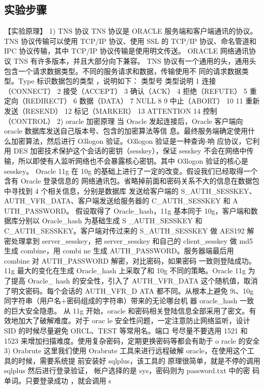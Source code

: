 \subsection{实验步骤}
【实验原理】
1) TNS 协议
TNS 协议是 ORACLE 服务端和客户端通讯的协议。TNS 协议传输可以使用 TCP/IP 协议、使用 SSL
的 TCP/IP 协议、命名管道和 IPC 协议传输，其中 TCP/IP 协议传输是使用明文传送。 ORACLE
网络通讯协议 TNS 有许多版本，并且大部分向下兼容。
TNS 协议有一个通用的头，通用头包含一个请求数据类型。不同的服务请求和数据，传输使用不
同的请求数据类型。Type 标识数据包的类型 ，说明如下：
类型号 类型说明
1 连接（CONNECT）
2 接受（ACCEPT）
3 确认（ACK）
4 拒绝（REFUTE）
5 重定向（REDIRECT）
6 数据（DATA）
7 NULL
8
9 中止（ABORT）
10
11 重新发送（RESEND）
12 标记（MARKER）
13 ATTENTION
14 控制（CONTROL）
2) oracle 加密原理
当 Oracle 发起连接后，Oracle 客户端向 oracle 数据库发送自己版本号、包含的加密算法等信
息。最终服务端确定使用什么加密算法，然后进行 O3logon 验证。O3logon 验证是一种查询-响
应协议，它利用 DES 加密技术保护这个会话的密钥（sesskey），保证 sesskey 不会在网络中传
输，所以即使有人监听网络也不会暴露核心密钥。其中 O3logon 验证的核心是 sesskey。
Oracle 11g 在 10g 的基础上进行了一定的改变。假设我们已经取得一个含有 Oracle 登录信息的
网络通讯包。省略掉前面和密码关系不大的信息在数据包中寻找到 4 个相关信息，分别是数据库
发送给客户端的 S_AUTH_SESSKEY、AUTH_VFR_DATA、客户端发送给服务器的 C_AUTH_SESSKEY 和 A
UTH_PASSWORD。
假设取得了 Oracle_hash，11g 基本同于 10g，客户端和数据库分别以 Oracle_hash 为基础生成 S
_AUTH_SESSKEY 和 C_AUTH_SESSKEY。客户端对传过来的 S_AUTH_SESSKEY 做 AES192 解密处理拿到
server_sesskey，把 server_sesskey 和自己的 client_sesskey 做 md5 生成 combine，用 combi
ne 生成 AUTH_PASSWORD。服务器端最后用 combine 对 AUTH_PASSWORD 解密，对比密码，如果密码
一致则登陆成功。
11g 最大的变化在生成 Oracle_hash 上采取了和 10g 不同的策略。Oracle 11g 为了提高 Oracle_
hash 的安全性，引入了 AUTH_VFR_DATA 这个随机值，取消了明文密码。每个会话的 AUTH_VFR_D
ATA 都不同。从根本上避免 9i、10g 同字符串（用户名+密码组成的字符串）带来的无论哪台机
器 oracle_hash 一致的巨大安全隐患。
从 11g 开始，oracle 和密码相关登陆信息全部采用了密文。有效地加大了破解难度。对于 orac
le 安全性问题，一定注意防止网络监听，设计 SID 的时候尽量避免 ORCL、TEST 等常用名。端口
号尽量不要选用 1521 和 1523 来增加扫描难度。使用复杂密码，定期更换密码等都会有助于 o
racle 的安全
3) Orabrute
这里我们使用 Orabrute 工具来进行远程破解 oracle，在使用这个工具的时候，需要系统提
前安装好 sqlplus，该工具的 原理很简单，就是不停的调用 sqlplus 然后进行登录验证，
帐户选择的是 sys，密码则为 password.txt 中的密 码单词。只要登录成功 ，就会调用 s
